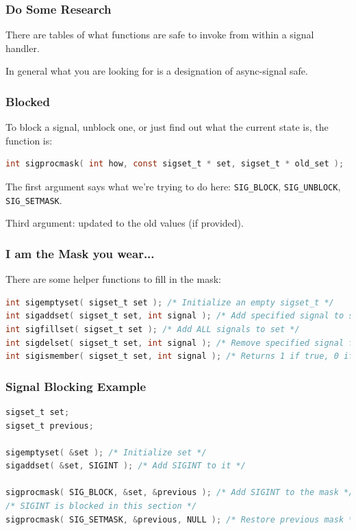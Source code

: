\begin{frame}
	\frametitle{Do Some Research}

	There are tables of what functions are safe to invoke from within a signal handler.

	In general what you are looking for is a designation of \alert{async-signal safe}.

\end{frame}


\begin{frame}[fragile]
	\frametitle{Blocked}

	To block a signal, unblock one, or just find out what the current state is, the function is:
	\begin{lstlisting}[language=C]
int sigprocmask( int how, const sigset_t * set, sigset_t * old_set );
\end{lstlisting}

	The first argument says what we're trying to do here: \texttt{SIG\_BLOCK}, \texttt{SIG\_UNBLOCK}, \texttt{SIG\_SETMASK}.

	Third argument: updated to the old values (if provided).

\end{frame}


\begin{frame}[fragile]
	\frametitle{I am the Mask you wear...}

	There are some helper functions to fill in the mask:
	\begin{lstlisting}[language=C]
int sigemptyset( sigset_t set ); /* Initialize an empty sigset_t */
int sigaddset( sigset_t set, int signal ); /* Add specified signal to set */
int sigfillset( sigset_t set ); /* Add ALL signals to set */
int sigdelset( sigset_t set, int signal ); /* Remove specified signal from set */
int sigismember( sigset_t set, int signal ); /* Returns 1 if true, 0 if false */
\end{lstlisting}

\end{frame}


\begin{frame}[fragile]
	\frametitle{Signal Blocking Example}

	\begin{lstlisting}[language=C]
sigset_t set;
sigset_t previous;

sigemptyset( &set ); /* Initialize set */
sigaddset( &set, SIGINT ); /* Add SIGINT to it */

sigprocmask( SIG_BLOCK, &set, &previous ); /* Add SIGINT to the mask */
/* SIGINT is blocked in this section */
sigprocmask( SIG_SETMASK, &previous, NULL ); /* Restore previous mask */

\end{lstlisting}

\end{frame}



